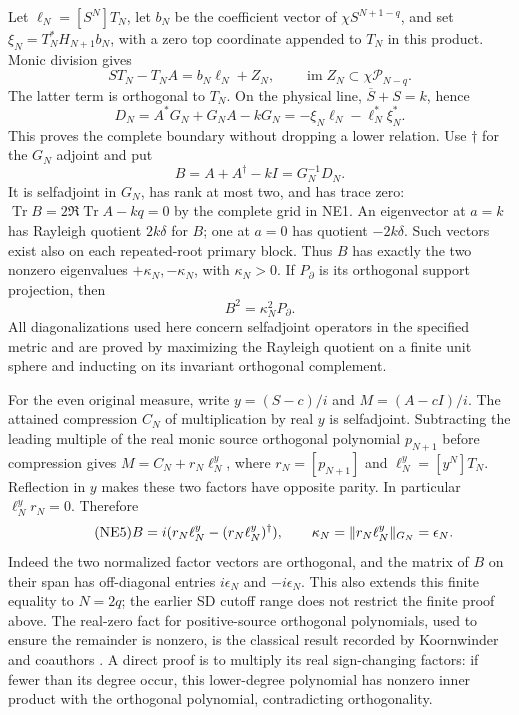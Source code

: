 \documentclass[11pt]{article}
\providecommand{\Tr}{\operatorname{Tr}}\providecommand{\Pp}{\mathcal P}
\begin{document}
Let $\ell_N=[S^N]T_N$, let $b_N$ be the coefficient vector of
$\chi S^{N+1-q}$, and set $\xi_N=T_N^*H_{N+1}b_N$, with a zero
top coordinate appended to $T_N$ in this product. Monic division gives
\[
S T_N-T_N A=b_N\ell_N+Z_N,
\qquad \operatorname{im}Z_N\subset\chi\mathcal P_{N-q}.
\]
The latter term is orthogonal to $T_N$. On the physical line,
$\overline S+S=k$, hence
\begin{equation}\tag{NE2}
D_N=A^*G_N+G_NA-kG_N=-\xi_N\ell_N-\ell_N^*\xi_N^*.
\end{equation}
This proves the complete boundary without dropping a lower relation.
Use $\dagger$ for the $G_N$ adjoint and put
\begin{equation}\tag{NE3}
B=A+A^\dagger-kI=G_N^{-1}D_N.
\end{equation}
It is selfadjoint in $G_N$, has rank at most two, and has trace zero:
$\Tr B=2\Re\Tr A-kq=0$ by the complete grid in NE1.
An eigenvector at $a=k$ has Rayleigh quotient $2k\delta$ for $B$;
one at $a=0$ has quotient $-2k\delta$. Such vectors exist also on each
repeated-root primary block. Thus $B$ has exactly the two nonzero
eigenvalues $+\kappa_N,-\kappa_N$, with $\kappa_N>0$. If $P_\partial$
is its orthogonal support projection, then
\begin{equation}\tag{NE4}
B^2=\kappa_N^2P_\partial.
\end{equation}
All diagonalizations used here concern selfadjoint operators in the
specified metric and are proved by maximizing the Rayleigh quotient
on a finite unit sphere and inducting on its invariant orthogonal
complement.

For the even original measure, write $y=(S-c)/i$ and $M=(A-cI)/i$.
The attained compression $C_N$ of multiplication by real $y$ is
selfadjoint. Subtracting the leading multiple of the real monic source
orthogonal polynomial $p_{N+1}$ before compression gives
$M=C_N+r_N\ell_N^{y}$, where $r_N=[p_{N+1}]$ and
$\ell_N^{y}=[y^N]T_N$. Reflection in $y$ makes these two factors have
opposite parity. In particular $\ell_N^{y}r_N=0$. Therefore
\begin{equation}\tag{NE5}
B=i(r_N\ell_N^{y}-(r_N\ell_N^{y})^\dagger),\qquad
\kappa_N=\lVert r_N\ell_N^{y}\rVert_{G_N}=\epsilon_N.
\end{equation}
Indeed the two normalized factor vectors are orthogonal, and the
matrix of $B$ on their span has off-diagonal entries $i\epsilon_N$
and $-i\epsilon_N$. This also extends this finite equality to $N=2q$;
the earlier SD cutoff range does not restrict the finite proof above.
The real-zero fact for positive-source orthogonal polynomials, used
to ensure the remainder is nonzero, is the classical result recorded
by Koornwinder and coauthors \cite[\S18.2(vi)]{ne-DLMF}. A direct proof is
to multiply its real sign-changing factors: if fewer than its degree
occur, this lower-degree polynomial has nonzero inner product with
the orthogonal polynomial, contradicting orthogonality.
\end{document}
